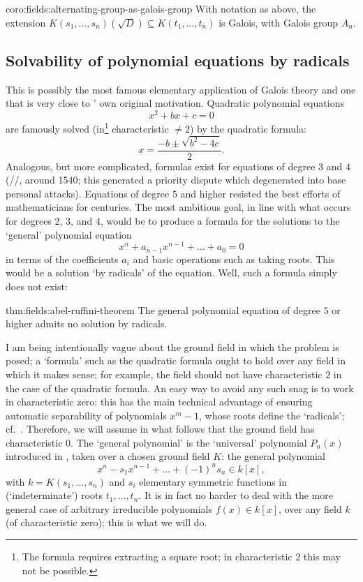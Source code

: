 \begin{coro}{}{coro:fields:alternating-group-as-galois-group}
  With notation as above, the extension
  $K(s_1, \dots, s_n)(\sqrt{D}) \subseteq K(t_1, \dots, t_n)$ is
  Galois, with Galois group $A_n$.
\end{coro}

\subsection{Solvability of polynomial equations by radicals}
\label{subsec:fields:solvability-of-polynomial-equations-by-radicals}
This is possibly the most famous elementary application of Galois
theory and one that is very close to ' own original
motivation.  Quadratic polynomial equations
\[
  x^2 + bx + c = 0
\]
are famously solved (in\footnote{The formula requires extracting a
  square root; in characteristic $2$ this may not be possible.}
characteristic $\neq 2$) by the quadratic formula:
\[
  x = \frac{-b \pm \sqrt{b^2 - 4c}}{2}.
\]
Analogous, but more complicated, formulas exist for equations of
degree $3$ and $4$ (//,
around 1540; this generated a priority dispute which degenerated into
base personal attacks). Equations of degree $5$ and higher resisted
the best efforts of mathematicians for centuries. The most ambitious
goal, in line with what occurs for degrees $2$, $3$, and $4$, would be
to produce a formula for the solutions to the `general' polynomial
equation
\[
  x^n + a_{n-1}x^{n-1} + \dots + a_0 = 0
\]
in terms of the coefficients $a_i$ and basic operations such as taking
roots. This would be a solution `by radicals' of the equation. Well,
such a formula simply does not exist:
\begin{thm}{}{thm:fields:abel-ruffini-theorem}
  The general polynomial equation of degree $5$ or higher admits no
  solution by radicals.
\end{thm}

I am being intentionally vague about the ground field in which the
problem is posed; a `formula' such as the quadratic formula ought to
hold over any field in which it makes sense; for example, the field
should not have characteristic $2$ in the case of the quadratic
formula. An easy way to avoid any such snag is to work in
characteristic zero: this has the main technical advantage of ensuring
automatic separability of polynomials $x^m - 1$, whose roots define
the `radicals'; cf.\ .  Therefore, we will
assume in what follows that the ground field has characteristic $0$.
The `general polynomial' is the `universal' polynomial $P_n(x)$
introduced in
,
taken over a chosen ground field $K$: the general polynomial
\[
  x^n - s_1 x^{n-1} + \dots + (-1)^n s_n \in k[x],
\]
with $k = K(s_1, \dots, s_n)$ and $s_i$ elementary symmetric functions
in (`indeterminate') roots $t_1, \dots, t_n$. It is in fact no harder
to deal with the more general case of arbitrary irreducible
polynomials $f(x) \in k[x]$, over any field $k$ (of characteristic
zero); this is what we will do.

